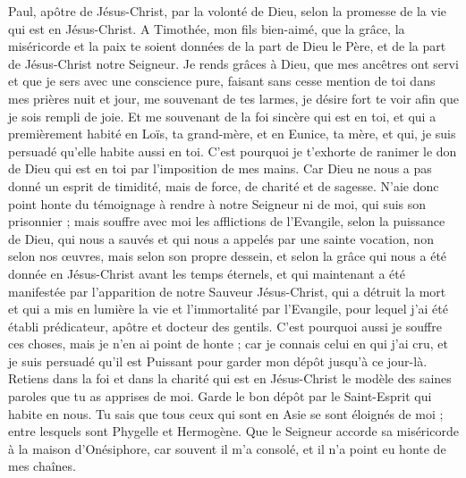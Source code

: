 \begin{multicols}{2}
\VerseOne{}Paul, apôtre de Jésus-Christ, par la volonté de Dieu, selon la promesse de la vie qui est en Jésus-Christ.
A Timothée, mon fils bien-aimé, que la grâce, la miséricorde et la paix te soient données de la part de Dieu le Père, et de la part de Jésus-Christ notre Seigneur.
Je rends grâces à Dieu, que mes ancêtres ont servi et que je sers avec une conscience pure, faisant sans cesse mention de toi dans mes prières nuit et jour,
me souvenant de tes larmes, je désire fort te voir afin que je sois rempli de joie.
Et me souvenant de la foi sincère qui est en toi, et qui a premièrement habité en Loïs, ta grand-mère, et en Eunice, ta mère, et qui, je suis persuadé qu'elle habite aussi en toi.
C'est pourquoi je t'exhorte de ranimer le don de Dieu qui est en toi par l'imposition de mes mains.
Car Dieu ne nous a pas donné un esprit de timidité, mais de force, de charité et de sagesse.
N’aie donc point honte du témoignage à rendre à notre Seigneur ni de moi, qui suis son prisonnier ; mais souffre avec moi les afflictions de l'Evangile, selon la puissance de Dieu,
qui nous a sauvés et qui nous a appelés par une sainte vocation, non selon nos œuvres, mais selon son propre dessein, et selon la grâce qui nous a été donnée en Jésus-Christ avant les temps éternels,
et qui maintenant a été manifestée par l'apparition de notre Sauveur Jésus-Christ, qui a détruit la mort et qui a mis en lumière la vie et l'immortalité par l'Evangile,
pour lequel j'ai été établi prédicateur, apôtre et docteur des gentils.
C'est pourquoi aussi je souffre ces choses, mais je n'en ai point de honte ; car je connais celui en qui j'ai cru, et je suis persuadé qu'il est Puissant pour garder mon dépôt jusqu'à ce jour-là.
Retiens dans la foi et dans la charité qui est en Jésus-Christ le modèle des saines paroles que tu as apprises de moi.
Garde le bon dépôt par le Saint-Esprit qui habite en nous.
Tu sais que tous ceux qui sont en Asie se sont éloignés de moi ; entre lesquels sont Phygelle et Hermogène.
Que le Seigneur accorde sa miséricorde à la maison d'Onésiphore, car souvent il m'a consolé, et il n'a point eu honte de mes chaînes.

\end{multicols}
